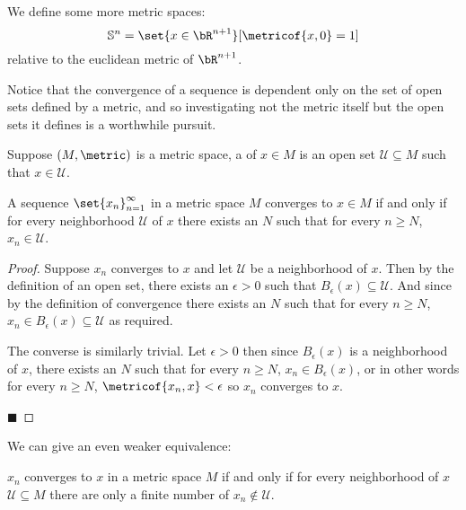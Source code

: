 \documentclass[10pt]{article}
\def\bS{\mathbb{S}}
\def\mU{\mathcal{U}}
\begin{document}
We define some more metric spaces:
\[ \bS^n = \set{x\in\bR^{n+1}}[\metricof{x,0}=1] \]
relative to the euclidean metric of $\bR^{n+1}$.

Notice that the convergence of a sequence is dependent only on the set of open sets defined by a metric, and so investigating not the metric itself but the open sets it defines is a worthwhile pursuit.

\begin{defn*}

    Suppose $(M,\metric)$ is a metric space, a  of $x\in M$ is an open set $\mU\subseteq M$ such that $x\in\mU$.

\end{defn*}

\begin{prop*}

    A sequence $\set{x_n}_{n=1}^\infty$ in a metric space $M$ converges to $x\in M$ if and only if for every neighborhood $\mU$ of $x$ there exists an $N$ such that for every $n\geq N$, $x_n\in\mU$.

\end{prop*}

\begin{proof}

    Suppose $x_n$ converges to $x$ and let $\mU$ be a neighborhood of $x$.
    Then by the definition of an open set, there exists an $\epsilon>0$ such that $B_\epsilon(x)\subseteq\mU$.
    And since by the definition of convergence there exists an $N$ such that for every $n\geq N$, $x_n\in B_\epsilon(x)\subseteq\mU$ as required.

    The converse is similarly trivial.
    Let $\epsilon>0$ then since $B_\epsilon(x)$ is a neighborhood of $x$, there exists an $N$ such that for every $n\geq N$, $x_n\in B_\epsilon(x)$, or in other words for every $n\geq N$,
    $\metricof{x_n,x}<\epsilon$ so $x_n$ converges to $x$.

    \hfill$\blacksquare$

\end{proof}

We can give an even weaker equivalence:

\begin{prop*}

    $x_n$ converges to $x$ in a metric space $M$ if and only if for every neighborhood of $x$ $\mU\subseteq M$ there are only a finite number of $x_n\notin\mU$.

\end{prop*}
\end{document}
